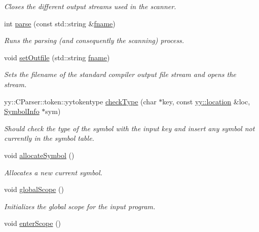 \begin{DoxyCompactItemize}
\begin{DoxyCompactList}\small\item\em Closes the different output streams used in the scanner. \end{DoxyCompactList}\item 
int \hyperlink{classCCompiler_a8698733d7659aa1bc138b033a9b4d7fe}{parse} (const std\-::string \&\hyperlink{classCCompiler_a60b1cadb0db77e19be3b13e80ceade72}{fname})
\begin{DoxyCompactList}\small\item\em Runs the parsing (and consequently the scanning) process. \end{DoxyCompactList}\item 
void \hyperlink{classCCompiler_a66089b35f2d1676f4a6639080a4177c0}{set\-Outfile} (std\-::string \hyperlink{classCCompiler_a60b1cadb0db77e19be3b13e80ceade72}{fname})
\begin{DoxyCompactList}\small\item\em Sets the filename of the standard compiler output file stream and opens the stream. \end{DoxyCompactList}\item 
yy\-::\-C\-Parser\-::token\-::yytokentype \hyperlink{classCCompiler_ae37bb9232064de17552090db6a2df97d}{check\-Type} (char $\ast$key, const \hyperlink{classyy_1_1location}{yy\-::location} \&loc, \hyperlink{structSymbolInfo}{Symbol\-Info} $\ast$sym)
\begin{DoxyCompactList}\small\item\em Should check the type of the symbol with the input key and insert any symbol not currently in the symbol table. \end{DoxyCompactList}\item 
\hypertarget{classCCompiler_adf3afdb8d707e764cabcafcb7ac3d66d}{void \hyperlink{classCCompiler_adf3afdb8d707e764cabcafcb7ac3d66d}{allocate\-Symbol} ()}\label{classCCompiler_adf3afdb8d707e764cabcafcb7ac3d66d}

\begin{DoxyCompactList}\small\item\em Allocates a new current symbol. \end{DoxyCompactList}\item 
\hypertarget{classCCompiler_a46e2be0b3d3bc44ecfe0b054e94676ba}{void \hyperlink{classCCompiler_a46e2be0b3d3bc44ecfe0b054e94676ba}{global\-Scope} ()}\label{classCCompiler_a46e2be0b3d3bc44ecfe0b054e94676ba}

\begin{DoxyCompactList}\small\item\em Initializes the global scope for the input program. \end{DoxyCompactList}\item 
\hypertarget{classCCompiler_a907195dbe90c35f4aeec4be6616e3f34}{void \hyperlink{classCCompiler_a907195dbe90c35f4aeec4be6616e3f34}{enter\-Scope} ()}\label{classCCompiler_a907195dbe90c35f4aeec4be6616e3f34}


\end{DoxyCompactItemize}
